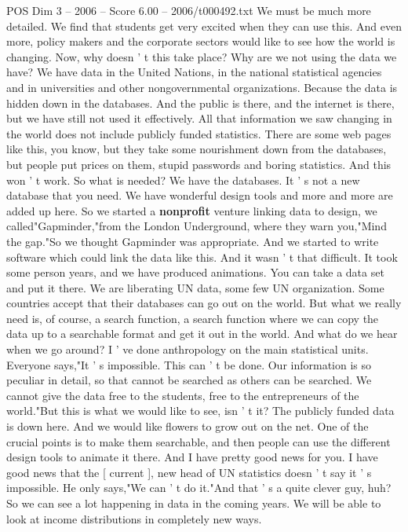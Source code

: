 \begin{textsample}{POS Dim 3 – 2006 – Score 6.00 – 2006/t000492.txt}
We must be much more detailed.
We find that students get very excited when they can use this.
And even more, policy makers and the corporate sectors would like to see how the world is changing.
Now, why doesn ' t this take place?
Why are we not using the data we have?
We have data in the United Nations, in the national statistical agencies and in universities and other nongovernmental organizations.
Because the data is hidden down in the databases.
And the public is there, and the internet is there, but we have still not used it effectively.
All that information we saw changing in the world does not include publicly funded statistics.
There are some web pages like this, you know, but they take some nourishment down from the databases, but people put prices on them, stupid passwords and boring statistics.
And this won ' t work.
So what is needed?
We have the databases.
It ' s not a new database that you need.
We have wonderful design tools and more and more are added up here.
So we started a \textbf{nonprofit} venture linking data to design, we called"Gapminder,"from the London Underground, where they warn you,"Mind the gap."So we thought Gapminder was appropriate.
And we started to write software which could link the data like this.
And it wasn ' t that difficult.
It took some person years, and we have produced animations.
You can take a data set and put it there.
We are liberating UN data, some few UN organization.
Some countries accept that their databases can go out on the world.
But what we really need is, of course, a search function, a search function where we can copy the data up to a searchable format and get it out in the world.
And what do we hear when we go around?
I ' ve done anthropology on the main statistical units.
Everyone says,"It ' s impossible.
This can ' t be done.
Our information is so peculiar in detail, so that cannot be searched as others can be searched.
We cannot give the data free to the students, free to the entrepreneurs of the world."But this is what we would like to see, isn ' t it?
The publicly funded data is down here.
And we would like flowers to grow out on the net.
One of the crucial points is to make them searchable, and then people can use the different design tools to animate it there.
And I have pretty good news for you.
I have good news that the [ current ], new head of UN statistics doesn ' t say it ' s impossible.
He only says,"We can ' t do it."And that ' s a quite clever guy, huh?
So we can see a lot happening in data in the coming years.
We will be able to look at income distributions in completely new ways.

\end{textsample}
